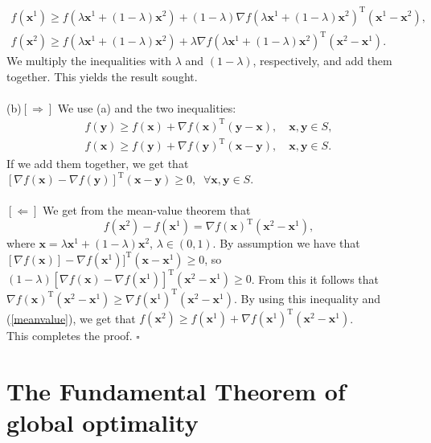 \documentclass[12pt, a4paper]{article}
\begin{document}
\begin{equation*}
\begin{split}
f(\bm{x}^1) \geq f(\lambda \bm{x}^1 + (1-\lambda)\bm{x}^2) + (1-\lambda)\nabla f(\lambda \bm{x}^1 + (1-\lambda)\bm{x}^2)^{\text{T}}(\bm{x}^1-\bm{x}^2),\\
f(\bm{x}^2) \geq f(\lambda \bm{x}^1 + (1-\lambda)\bm{x}^2) + \lambda\nabla f(\lambda \bm{x}^1 + (1-\lambda)\bm{x}^2)^{\text{T}}(\bm{x}^2-\bm{x}^1).\hspace{21pt}
\end{split}
\end{equation*}
We multiply the inequalities with $\lambda$ and $(1-\lambda)$, respectively, and add them together. This yields the result sought.
\\\\
(b)$[\Rightarrow]$ We use (a) and the two inequalities:
\begin{equation*}
\begin{split}
f(\bm{y})\geq f(\bm{x})+\nabla f(\bm{x})^{\text{T}}(\bm{y-x}),\quad \bm{x,y}\in S,\\
f(\bm{x})\geq f(\bm{y})+\nabla f(\bm{y})^{\text{T}}(\bm{x-y}),\quad \bm{x,y}\in S.
\end{split}
\end{equation*}
If we add them together, we get that $[\nabla f(\bm{x})-\nabla f(\bm{y})]^{\text{T}}(\bm{x-y})\geq 0,\;\; \forall \bm{x,y}\in S$.
\\\\
$[\Leftarrow]$ We get from the mean-value theorem that
\begin{equation}
\label{meanvalue}
f(\bm{x}^2)-f(\bm{x}^1) = \nabla f(\bm{x})^{\text{T}}(\bm{x}^2-\bm{x}^1),
\end{equation}
where $\bm{x} = \lambda \bm{x}^1 + (1-\lambda) \bm{x}^2$, $\lambda \in (0,1)$. By assumption we have that $[\nabla f(\bm{x})]-\nabla f(\bm{x}^1)]^{\text{T}}(\bm{x}-\bm{x}^1)\geq 0$, so $(1-\lambda)[\nabla f(\bm{x})-\nabla f(\bm{x}^1)]^{\text{T}}(\bm{x}^2-\bm{x}^1)\geq 0$. From this it follows that $\nabla f(\bm{x})^{\text{T}}(\bm{x}^2-\bm{x}^1) \geq \nabla f(\bm{x}^1)^{\text{T}}(\bm{x}^2-\bm{x}^1)$. By using this inequality and (\ref{meanvalue}), we get that $f(\bm{x}^2)\geq f(\bm{x}^1)+\nabla f(\bm{x}^1)^{\text{T}}(\bm{x}^2-\bm{x}^1)$.
\\
This completes the proof. $\square$


\section{The Fundamental Theorem of global optimality}
\end{document}
